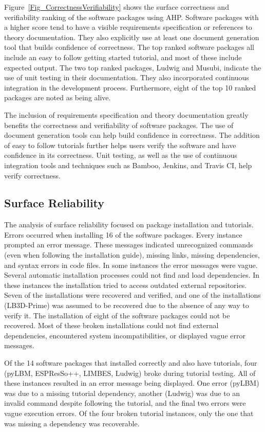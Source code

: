 \documentclass[final, 3p, times, authoryear]{elsarticle}
\begin{document}
Figure~\ref{Fig_CorrectnessVerifiability} shows the surface correctness and
verifiability ranking of the software packages using AHP. Software packages with
a higher score tend to have a visible requirements specification or references
to theory documentation. They also explicitly use at least one document
generation tool that builds confidence of correctness. The top ranked software
packages all include an easy to follow getting started tutorial, and most of
these include expected output. The two top ranked packages, Ludwig and Musubi, indicate the use of unit testing in their documentation. They also incorporated continuous integration in the development process. Furthermore, eight of the top 10 ranked packages are noted as being alive.

The inclusion of requirements specification and theory documentation greatly
benefits the correctness and verifiability of software packages. The use of
document generation tools can help build confidence in correctness. The addition
of easy to follow tutorials further helps users verify the software and have
confidence in its correctness. Unit testing, as well as the use of continuous
integration tools and techniques such as Bamboo, Jenkins, and Travis CI, help
verify correctness.

\subsection{Surface Reliability}

The analysis of surface reliability focused on package installation and
tutorials. Errors occurred when installing 16 of the software packages. Every
instance prompted an error message. These messages indicated unrecognized
commands (even when following the installation guide), missing links, missing
dependencies, and syntax errors in code files. In some instances the error messages were vague. Several automatic installation processes could not find and load dependencies. In these instances the installation tried to access outdated external repositories. Seven of the installations were recovered and verified, and one of the installations (LB3D-Prime) was assumed to be recovered due to the absence of any way to verify it. The installation of eight of the software packages could not be recovered. Most of these broken installations could not find external dependencies, encountered system incompatibilities, or displayed vague error messages. 

Of the 14 software packages that installed correctly and also have tutorials,
four (pyLBM, ESPResSo++, LIMBES, Ludwig) broke during tutorial testing. All of
these instances resulted in an error message being displayed. One error (pyLBM)
was due to a missing tutorial dependency, another (Ludwig) was due to an invalid
command despite following the tutorial, and the final two errors were vague
execution errors. Of the four broken tutorial instances, only the one that was
missing a dependency was recoverable. 
\end{document}
